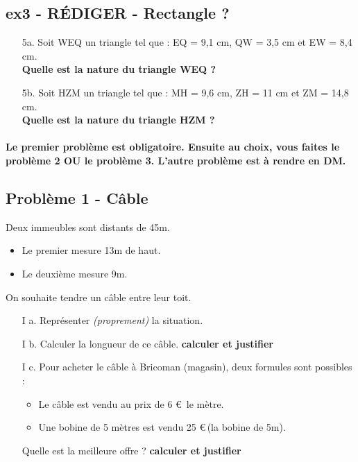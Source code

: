 \documentclass[12pt]{article}
\begin{document}
\subsection*{ex3 - \textbf{RÉDIGER} - Rectangle ?}

\begin{enumerate}
  \item[5a.]Soit WEQ un triangle tel que : EQ = 9,1 cm, QW = 3,5 cm et EW = 8,4 cm.\\
  \textbf{Quelle est la nature du triangle WEQ ?} \\ \Pointilles[4]

  \item[5b.]Soit HZM un triangle tel que : MH = 9,6 cm, ZH = 11 cm et ZM = 14,8 cm. \\
  \textbf{Quelle est la nature du triangle HZM ?} \\ \Pointilles[4]
\end{enumerate}


\newpage

\paragraph{Le premier problème est obligatoire. Ensuite au choix, vous faites le problème 2 \textbf{OU} le problème 3. L'autre problème est à rendre en DM.}

\subsection*{Problème 1 - Câble}

Deux immeubles sont distants de 45m. 
  \begin{itemize}
  \item Le premier mesure 13m de haut.
  \item Le deuxième mesure 9m. 
  \end{itemize}

On souhaite tendre un câble entre leur toit. 

\begin{enumerate}
  \item[I a.] Représenter \textit{(proprement)} la situation.

  \item[I b.] Calculer la longueur de ce câble. \textbf{calculer et justifier}

  \item[I c.] Pour acheter le câble à Bricoman (magasin), deux formules sont possibles :  
  \begin{itemize}
  \item Le câble est vendu  au prix de 6 \euro \, le mètre. 
  \item Une bobine de 5 mètres est vendu 25 \euro \,(la bobine de 5m). 
  \end{itemize} 
  Quelle est la meilleure offre ? \textbf{calculer et justifier}
\end{enumerate}
\end{document}
